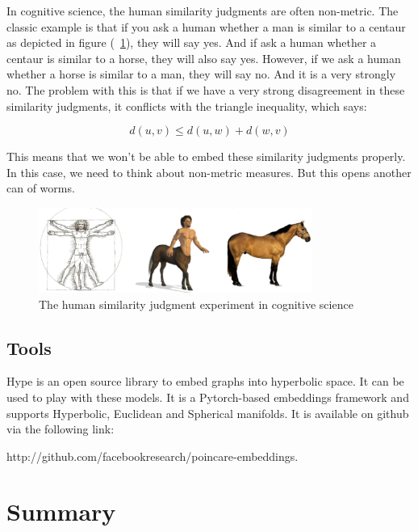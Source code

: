 In cognitive science, the human similarity judgments are often non-metric. The classic example is that if you ask a human whether a man is similar to a centaur as depicted in figure (~\ref{fig:3-cog}), they will say yes. And if ask a human whether a centaur is similar to a horse, they will also say yes. However, if we ask a human whether a horse is similar to a man, they will say no. And it is a very strongly no. The problem with this is that if we have a very strong disagreement in these similarity judgments, it conflicts with the triangle inequality, which says: 

\begin{equation} \label{eq:triangleIne}
    d(u,v) \leq d(u, w) + d(w, v)
\end{equation}

This means that we won't be able to embed these similarity judgments properly. In this case, we need to think about non-metric measures. But this opens another can of worms.

\begin{figure}[htb]
  \begin{center}
    \includegraphics[width=0.8\textwidth]{lectures/11-b/Images/3-cog.png}
    \caption{The human similarity judgment experiment in cognitive science}
    \label{fig:3-cog}
    \end{center}
\end{figure}

\subsection{Tools}

Hype is an open source library to embed graphs into hyperbolic space. It can be used to play with these models. It is a Pytorch-based embeddings framework and supports Hyperbolic, Euclidean and Spherical manifolds. It is available on github via the following link:

http://github.com/facebookresearch/poincare-embeddings.


\section{Summary}

